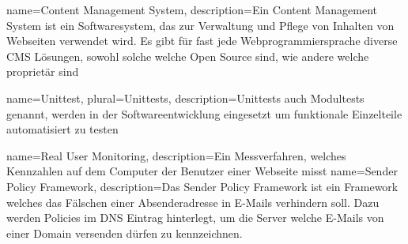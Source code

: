 {
  name={Content Management System},
  description={Ein Content Management System ist ein Softwaresystem, das zur Verwaltung und Pflege von Inhalten von Webseiten verwendet wird. Es gibt für fast jede Webprogrammiersprache diverse CMS Lösungen, sowohl solche welche Open Source sind, wie andere welche proprietär sind}
}

{
  name=Unittest,
  plural=Unittests,
  description={Unittests auch Modultests genannt, werden in der Softwareentwicklung eingesetzt um funktionale Einzelteile automatisiert zu testen\cite[S. 44]{books/daglib/0007083}}
}

{
  name={Real User Monitoring},
  description={Ein Messverfahren, welches Kennzahlen auf dem Computer der Benutzer einer Webseite misst}
}
{
  name={Sender Policy Framework},
  description={Das Sender Policy Framework ist ein Framework welches das Fälschen einer Absenderadresse in E-Mails verhindern soll. Dazu werden Policies im DNS Eintrag hinterlegt, um die Server welche E-Mails von einer Domain versenden dürfen zu kennzeichnen.}
}




\renewcommand*{\glsgroupskip}{}